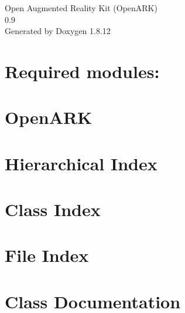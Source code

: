\documentclass[twoside]{book}
\newcommand{\+}{\discretionary{\mbox{\scriptsize$\hookleftarrow$}}{}{}}
\newcommand{\clearemptydoublepage}{%
  \newpage{\pagestyle{empty}\cleardoublepage}%
}
\begin{document}
\hypersetup{pageanchor=false,
             bookmarksnumbered=true,
             pdfencoding=unicode
            }
\begin{titlepage}
\vspace*{7cm}
\begin{center}%
{\Large Open Augmented Reality Kit (Open\+A\+RK) \\[1ex]\large 0.\+9 }\\
\vspace*{1cm}
{\large Generated by Doxygen 1.8.12}\\
\end{center}
\end{titlepage}
\clearemptydoublepage
{}
\tableofcontents
\clearemptydoublepage
{}
\hypersetup{pageanchor=true}

\chapter{Required modules\+:}
\label{md__d_1__open_a_r_k__open_a_r_k-_s_d_k__r_e_a_d_m_e}
\hypertarget{md__d_1__open_a_r_k__open_a_r_k-_s_d_k__r_e_a_d_m_e}{}

\chapter{Open\+A\+RK}
\label{md__d_1__open_a_r_k__r_e_a_d_m_e}
\hypertarget{md__d_1__open_a_r_k__r_e_a_d_m_e}{}

\chapter{Hierarchical Index}

\chapter{Class Index}

\chapter{File Index}

\chapter{Class Documentation}











\end{document}
